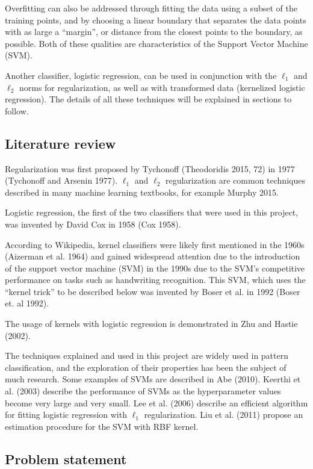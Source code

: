 \documentclass[letterpaper, 11pt]{article}
\begin{document}
Overfitting can also be addressed through fitting the data using a subset of the training points, and by choosing a linear boundary that separates the data points with as large a ``margin'', or distance from the closest points to the boundary, as possible. Both of these qualities are characteristics of the Support Vector Machine (SVM).

Another classifier, logistic regression, can be used in conjunction with the $\ell_1$ and $\ell_2$ norms for regularization, as well as with transformed data (kernelized logistic regression). The details of all these techniques will be explained in sections to follow.

\subsection{Literature review}

Regularization was first proposed by Tychonoff (Theodoridis 2015, 72) in 1977 (Tychonoff and Arsenin 1977). $\ell_1$ and $\ell_2$ regularization are common techniques described in many machine learning textbooks, for example Murphy 2015.

Logistic regression, the first of the two classifiers that were used in this project, was invented by David Cox in 1958 (Cox 1958).

According to Wikipedia, kernel classifiers were likely first mentioned in the 1960s (Aizerman et al. 1964) and gained widespread attention due to the introduction of the support vector machine (SVM) in the 1990s due to the SVM's competitive performance on tasks such as handwriting recognition. This SVM, which uses the ``kernel trick'' to be described below was invented by Boser et al. in 1992 (Boser et. al 1992).

The usage of kernels with logistic regression is demonstrated in Zhu and Hastie (2002).

The techniques explained and used in this project are widely used in pattern classification, and the exploration of their properties has been the subject of much research. Some examples of SVMs are described in Abe (2010). Keerthi et al. (2003) describe the performance of SVMs as the hyperparameter values become very large and very small. Lee et al. (2006) describe an efficient algorithm for fitting logistic regression with $\ell_1$ regularization. Liu et al. (2011) propose an estimation procedure for the SVM with RBF kernel.

\subsection{Problem statement}
\end{document}
